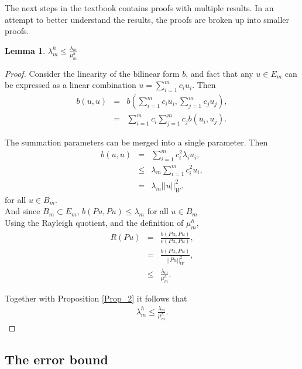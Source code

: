 \documentclass[../../main.tex]{subfiles}
\begin{document}
The next steps in the textbook \cite{SF73} contains proofs with multiple results. In an attempt to better understand the results, the proofs are broken up into smaller proofs.

\newtheorem{Lem_1}{Lemma} 
\begin{Lem_1}
	\label{Lem_1}
	$\displaystyle \lambda_{m}^{h} \leq \frac{\lambda_{m}}{\mu_{m}^{h}}$
\end{Lem_1}
\begin{proof}
	Consider the linearity of the bilinear form $b$, and fact that any $u \in E_m$ can be expressed as a linear combination $u = \sum_{i=1}^{m} c_{i}u_{i}$. Then
	\begin{eqnarray*}
	b(u,u) &=& b\left(\sum_{i=1}^{m} c_{i}u_{i},\sum_{j=1}^{m} c_{j}u_{j}\right),\\
			&=& \sum_{i=1}^{m} c_{i}\sum_{j=1}^{m} c_{j} b(u_{i},u_{j}).
	\end{eqnarray*}

	The summation parameters can be merged into a single parameter. Then
	\begin{eqnarray*}
		b(u,u)  & = & \sum_{i=1}^{m} c_{i}^{2} \lambda_{i} u_i,\\
				& \leq & \lambda_{m}\sum_{i=1}^{m} c_{i}^{2} u_i,\\
				& = & \lambda_{m}||u||_{W}^2.
	\end{eqnarray*} for all $u \in B_m$.\\
	
	
	And since $B_{m} \subset E_{m}$, $b(Pu,Pu) \leq \lambda_{m}$ for all $u\in B_{m}$\\
	
	Using the Rayleigh quotient, and the definition of $\mu_{m}^{h}$, 
	\begin{eqnarray*}
		R(Pu) &=& \frac{b(Pu,Pu)}{c(Pu,Pu)},\\
			&=& \frac{b(Pu,Pu)}{||Pu||_{W}^{2}},\\
			&\leq & \frac{\lambda_{m}}{\mu_{m}^{h}}.
	\end{eqnarray*}

	Together with Proposition \ref{Prop_2} it follows that
	\begin{eqnarray*}
		\lambda_{m}^{h} \leq \frac{\lambda_{m}}{\mu_{m}^{h}}.
	\end{eqnarray*}
\end{proof}

\subsection{The error bound}
\end{document}
